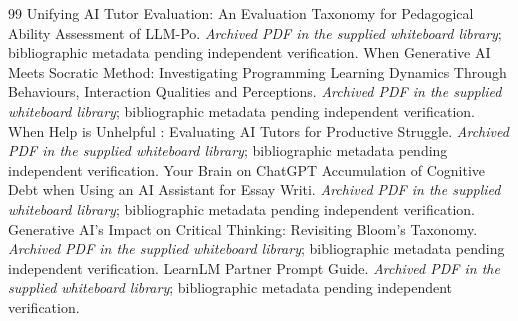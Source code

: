 \begin{thebibliography}{99}
 Unifying AI Tutor Evaluation: An Evaluation Taxonomy for Pedagogical Ability Assessment of LLM-Po. \emph{Archived PDF in the supplied whiteboard library}; bibliographic metadata pending independent verification.
 When Generative AI Meets Socratic Method: Investigating Programming Learning Dynamics Through Behaviours, Interaction Qualities and Perceptions. \emph{Archived PDF in the supplied whiteboard library}; bibliographic metadata pending independent verification.
 When Help is Unhelpful : Evaluating AI Tutors for Productive Struggle. \emph{Archived PDF in the supplied whiteboard library}; bibliographic metadata pending independent verification.
 Your Brain on ChatGPT Accumulation of Cognitive Debt when Using an AI Assistant for Essay Writi. \emph{Archived PDF in the supplied whiteboard library}; bibliographic metadata pending independent verification.
 Generative AI's Impact on Critical Thinking: Revisiting Bloom's Taxonomy. \emph{Archived PDF in the supplied whiteboard library}; bibliographic metadata pending independent verification.
 LearnLM Partner Prompt Guide. \emph{Archived PDF in the supplied whiteboard library}; bibliographic metadata pending independent verification.
\end{thebibliography}
